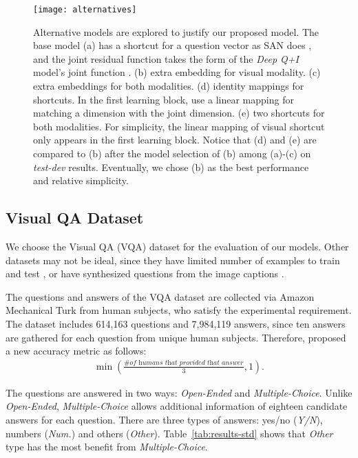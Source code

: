 \documentclass{article}
\begin{document}
\begin{figure}[t]
\centering
\texttt{[image: alternatives]}
\caption{Alternative models are explored to justify our proposed model. The base model (a) has a shortcut for a question vector as SAN does \cite{Yang2015}, and the joint residual function takes the form of the \textit{Deep Q+I} model's joint function \cite{Lu2015}. (b) extra embedding for visual modality. (c) extra embeddings for both modalities. (d) identity mappings for shortcuts. In the first learning block, use a linear mapping for matching a dimension with the joint dimension. (e) two shortcuts for both modalities. For simplicity, the linear mapping of visual shortcut only appears in the first learning block. Notice that (d) and (e) are compared to (b) after the model selection of (b) among (a)-(c) on \textit{test-dev} results. Eventually, we chose (b) as the best performance and relative simplicity.}
\label{fig:alternatives}
\end{figure}

\subsection{Visual QA Dataset}


We choose the Visual QA (VQA) dataset \cite{Antol2015} for the evaluation of our models. Other datasets may not be ideal, since they have limited number of examples to train and test \cite{Malinowski2015}, or have synthesized questions from the image captions \cite{Lin2014,Ren2015}.

The questions and answers of the VQA dataset are collected via Amazon Mechanical Turk from human subjects, who satisfy the experimental requirement. The dataset includes 614,163 questions and 7,984,119 answers, since ten answers are gathered for each question from unique human subjects. Therefore, \citet{Antol2015} proposed a new accuracy metric as follows: \begin{align}
   \min\left( \frac{\textit{\# of humans that provided that answer}}{3}, 1 \right).
\end{align} 

The questions are answered in two ways: \textit{Open-Ended} and \textit{Multiple-Choice}. Unlike \textit{Open-Ended}, \textit{Multiple-Choice} allows additional information of eighteen candidate answers for each question. There are three types of answers: yes/no (\textit{Y/N}), numbers (\textit{Num.}) and others (\textit{Other}). Table~\ref{tab:results-std} shows that \textit{Other} type has the most benefit from \textit{Multiple-Choice}.
\end{document}
